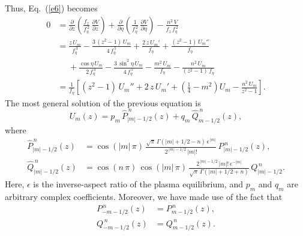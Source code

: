\documentclass[12pt,prb,aps,notitlepage]{revtex4-1}
\begin{document}
Thus, Eq.~(\ref{e6}) becomes 
\begin{align}
0&=\frac{\partial}{\partial z}\!\left(\frac{f_z}{f_\eta^{\,2}}\,\frac{\partial V}{\partial z}\right)+ \frac{\partial}{\partial \eta}\!\left(\frac{1}{f_\eta^{\,2}}\,\frac{\partial V}{\partial \eta}\right)
-\frac{n^2\,V}{f_z\,f_\eta^{\,2}}\nonumber\\[0.5ex]&
= \frac{z\,U_m}{f_\eta^{\,3}} -\frac{3\,(z^2-1)\,U_m}{4\,f_\eta^{\,5}}
+\frac{2\,z\,U_m'}{f_\eta}
+\frac{(z^2-1)\,U_m''}{f_\eta}\nonumber\\[0.5ex]
&\phantom{=}+\frac{\cos\eta\,U_m}{2\,f_\eta^{\,3}}- \frac{3\,\sin^2\eta\,U_m}{4\,f_\eta^{\,5}} - \frac{m^2\,U_m}{f_\eta} -\frac{n^2\,U_m}{(z^2-1)\,f_\eta}\nonumber\\[0.5ex]
&=\frac{1}{f_\eta}\left[(z^2-1)\,U_m'' + 2\,z\,U_m' + \left(\frac{1}{4}-m^2\right)U_m - \frac{n^2\,U_m}{z^2-1}\right].
\end{align}
The most general solution of the previous equation is
\begin{equation}
U_m(z) = p_m\,\hat{P}_{|m|-1/2}^{\,n}(z)+q_m\,\hat{Q}_{m-1/2}^{\,n}(z),
\end{equation}
where
\begin{align}
\hat{P}_{|m|-1/2}^{\,n}(z) &= \cos(|m|\,\pi)\,\frac{\sqrt{\pi}\,\Gamma(|m|+1/2-n)\,\epsilon^{\,|m|}}{2^{\,|m|-1/2}\,|m|!}\,P_{|m|-1/2}^{\,n}(z),\\[0.5ex]
\hat{Q}_{|m|-1/2}^{\,n}(z)&= \cos(n\,\pi)\,\cos(|m|\,\pi)\,\frac{2^{\,|m|-1/2}\,|m|!\,\epsilon^{-|m|}}{\sqrt{\pi}\,\Gamma(|m|+1/2+n)}\,Q_{|m|-1/2}^{\,n}.
\end{align}
Here,  $\epsilon$ is the inverse-aspect ratio of the plasma equilibrium, and  $p_m$ and $q_m$ are arbitrary complex coefficients. 
Moreover, we have made use of the fact that 
\begin{align}
P_{-m-1/2}^{\,n}(z) &= P_{m-1/2}^{\,n}(z),\\[0.5ex]
Q_{-m-1/2}^{\,n}(z) &= Q_{m-1/2}^{\,n}(z).
\end{align}
\end{document}
